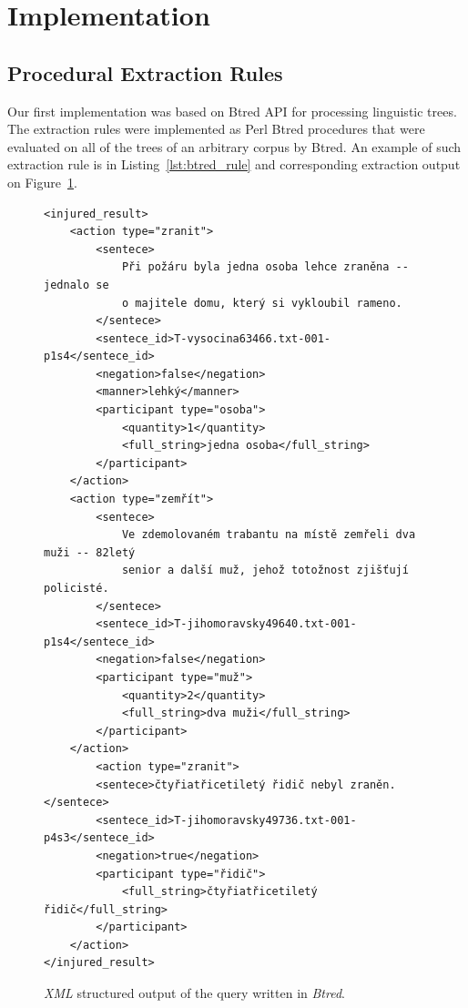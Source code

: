 \section{Implementation}

\subsection{Procedural Extraction Rules} \label{sec:ch50_Procedural_Extraction_Rules}

Our first implementation was based on Btred API for processing linguistic trees. The extraction rules were implemented as Perl Btred procedures that were evaluated on all of the trees of an arbitrary corpus by Btred. An example of such extraction rule is in Listing~\ref{lst:btred_rule} and corresponding extraction output on Figure~\ref{fig:btred_xml}.


\begin{figure}[ht]
\begin{verbatim}
<injured_result>
	<action type="zranit">
		<sentece>
			Při požáru byla jedna osoba lehce zraněna -- jednalo se
			o majitele domu, který si vykloubil rameno.
		</sentece>
		<sentece_id>T-vysocina63466.txt-001-p1s4</sentece_id>
		<negation>false</negation>
		<manner>lehký</manner>
		<participant type="osoba">
			<quantity>1</quantity>
			<full_string>jedna osoba</full_string>
		</participant>
	</action>
	<action type="zemřít">
		<sentece>
			Ve zdemolovaném trabantu na místě zemřeli dva muži -- 82letý
			senior a další muž, jehož totožnost zjišťují policisté.
		</sentece>
		<sentece_id>T-jihomoravsky49640.txt-001-p1s4</sentece_id>
		<negation>false</negation>
		<participant type="muž">
			<quantity>2</quantity>
			<full_string>dva muži</full_string>
		</participant>
	</action>
		<action type="zranit">
		<sentece>čtyřiatřicetiletý řidič nebyl zraněn.</sentece>
		<sentece_id>T-jihomoravsky49736.txt-001-p4s3</sentece_id>
		<negation>true</negation>
		<participant type="řidič">
			<full_string>čtyřiatřicetiletý řidič</full_string>
		</participant>
	</action>
</injured_result>
\end{verbatim}
\caption{\emph{XML} structured output of the query written in \emph{Btred}.}
\label{fig:btred_xml}
\end{figure}




